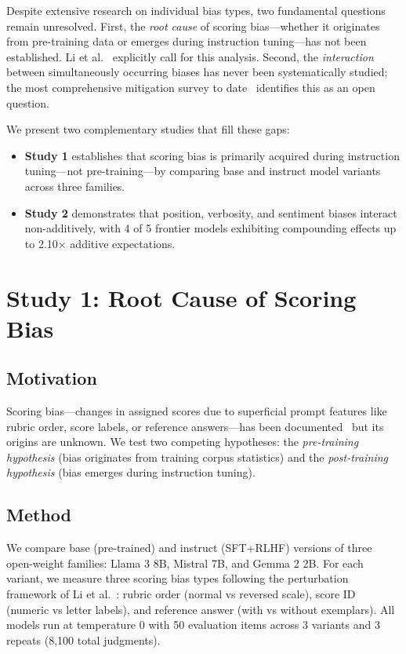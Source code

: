 \documentclass[11pt,twocolumn]{article}
\begin{document}
Despite extensive research on individual bias types, two fundamental questions remain unresolved. First, the \emph{root cause} of scoring bias---whether it originates from pre-training data or emerges during instruction tuning---has not been established. Li et al.~\cite{li2025scoring} explicitly call for this analysis. Second, the \emph{interaction} between simultaneously occurring biases has never been systematically studied; the most comprehensive mitigation survey to date~\cite{soumik2026judging} identifies this as an open question.

We present two complementary studies that fill these gaps:
\begin{itemize}
    \item \textbf{Study 1} establishes that scoring bias is primarily acquired during instruction tuning---not pre-training---by comparing base and instruct model variants across three families.
    \item \textbf{Study 2} demonstrates that position, verbosity, and sentiment biases interact non-additively, with 4 of 5 frontier models exhibiting compounding effects up to 2.10$\times$ additive expectations.
\end{itemize}

\section{Study 1: Root Cause of Scoring Bias}

\subsection{Motivation}
Scoring bias---changes in assigned scores due to superficial prompt features like rubric order, score labels, or reference answers---has been documented~\cite{li2025scoring} but its origins are unknown. We test two competing hypotheses: the \emph{pre-training hypothesis} (bias originates from training corpus statistics) and the \emph{post-training hypothesis} (bias emerges during instruction tuning).

\subsection{Method}
We compare base (pre-trained) and instruct (SFT+RLHF) versions of three open-weight families: Llama 3 8B, Mistral 7B, and Gemma 2 2B. For each variant, we measure three scoring bias types following the perturbation framework of Li et al.~\cite{li2025scoring}: rubric order (normal vs reversed scale), score ID (numeric vs letter labels), and reference answer (with vs without exemplars). All models run at temperature 0 with 50 evaluation items across 3 variants and 3 repeats (8,100 total judgments).
\end{document}
